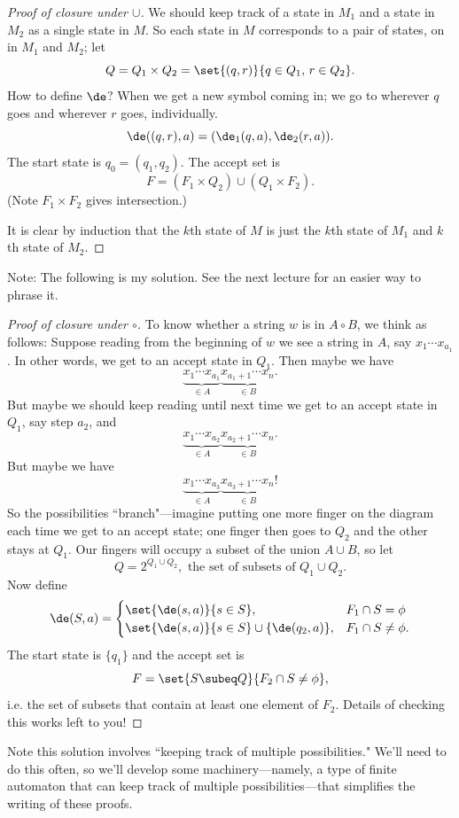 \begin{proof}[Proof of closure under $\cup$]
We should keep track of a state in $M_1$ and a state in $M_2$ as a single state in $M$. So each state in $M$ corresponds to a pair of states, on in $M_1$ and $M_2$; let
\[Q=Q_1\times Q_2=\set{(q,r)}{q\in Q_1,\,r\in Q_2}.\]
How to define $\de$? When we get a new symbol coming in; we go to wherever $q$ goes and wherever $r$ goes, individually.
\[
\de((q,r),a)=(\de_1(q,a),\de_2(r,a)).
\]
The start state is $q_0=(q_1,q_2)$. The accept set is
\[
F=(F_1\times Q_2)\cup (Q_1\times F_2).
\]
(Note $F_1\times F_2$ gives intersection.)

It is clear by induction that the $k$th state of $M$ is just the $k$th state of $M_1$ and $k$th state of $M_2$.
\end{proof}

Note: The following is my solution. See the next lecture for an easier way to phrase it.
\begin{proof}[Proof of closure under $\circ$]
To know whether a string $w$ is in $A\circ B$, we think as follows: Suppose reading from the beginning of $w$ we see a string in $A$, say $x_1\cdots x_{a_1}$. In other words, we get to an accept state in $Q_1$. Then maybe we have
\[
\underbrace{x_1\cdots x_{a_1}}_{\in A}\underbrace{x_{a_1+1}\cdots x_{n}}_{\in B}.
\]
But maybe we should keep reading until next time we get to an accept state in $Q_1$, say step $a_2$, and 
\[
\underbrace{x_1\cdots x_{a_2}}_{\in A}\underbrace{x_{a_2+1}\cdots x_{n}}_{\in B}.
\]
But maybe we have 
\[
\underbrace{x_1\cdots x_{a_3}}_{\in A}\underbrace{x_{a_3+1}\cdots x_{n}}_{\in B}!
\]
So the possibilities ``branch"---imagine putting one more finger on the diagram each time we get to an accept state; one finger then goes to $Q_2$ and the other stays at $Q_1$. Our fingers will occupy a subset of the union $A\cup B$, so let
\[
Q=2^{Q_1\cup Q_2},\text{ the set of subsets of }Q_1\cup Q_2.
\]
Now define
\[
\de(S,a)=\begin{cases}\set{\de(s,a)}{s\in S},&F_1\cap S= \phi\\
\set{\de(s,a)}{s\in S}\cup \{\de(q_2,a)\},&F_1\cap S\ne \phi.
\end{cases}
\]
The start state is $\{q_1\}$ and the accept set is
\[
F=\set{S\subeq Q}{F_2\cap S\ne \phi},
\]
i.e. the set of subsets that contain at least one element of $F_2$. Details of checking this works left to you!
\end{proof}
Note this solution involves ``keeping track of multiple possibilities." We'll need to do this often, so we'll develop some machinery---namely, a type of finite automaton that can keep track of multiple possibilities---that simplifies the writing of these proofs.